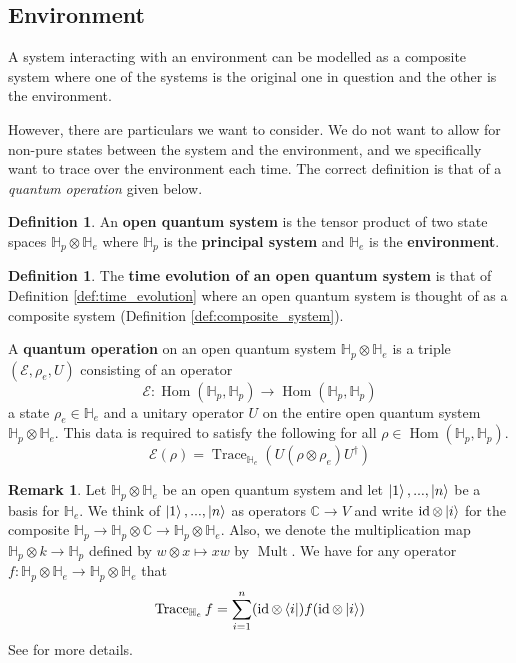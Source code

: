 \documentclass[12pt]{article}
\theoremstyle{plain}
\theoremstyle{definition}
\newtheorem{defn}[thm]{Definition} %
\newtheorem{remark}[thm]{Remark}
\newcommand{\bb}[1]{\mathbb{#1}}
\newcommand{\call}[1]{\mathcal{#1}}
\newcommand{\lto}{\longrightarrow}
\begin{document}
	\subsection{Environment}
	A system interacting with an environment can be modelled as a composite system where one of the systems is the original one in question and the other is the environment.
	
	However, there are particulars we want to consider. We do not want to allow for non-pure states between the system and the environment, and we specifically want to trace over the environment each time. The correct definition is that of a \emph{quantum operation} given below.
	
	\begin{defn}
		An \textbf{open quantum system} is the tensor product of two state spaces $\bb{H}_p \otimes \bb{H}_e$ where $\bb{H}_p$ is the \textbf{principal system} and $\bb{H}_e$ is the \textbf{environment}.
	\end{defn}
	\begin{defn}\label{def:quantum_operation_partial_trace}
		The \textbf{time evolution of an open quantum system} is that of Definition \ref{def:time_evolution} where an open quantum system is thought of as a composite system (Definition \ref{def:composite_system}).
		
		A \textbf{quantum operation} on an open quantum system $\bb{H}_p \otimes \bb{H}_e$ is a triple $(\call{E}, \rho_e, U)$ consisting of an operator
		\begin{equation}
			\call{E}: \operatorname{Hom}(\bb{H}_p, \bb{H}_p) \lto \operatorname{Hom}(\bb{H}_p, \bb{H}_p)
			\end{equation}
		a state $\rho_e \in \bb{H}_e$ and a unitary operator $U$ on the entire open quantum system $\bb{H}_p\otimes \bb{H}_e$. This data is required to satisfy the following for all $\rho \in \operatorname{Hom}(\bb{H}_p, \bb{H}_p)$.
		\begin{equation}\label{eq:quant_op_general_form}
			\call{E}(\rho) = \operatorname{Trace}_{\bb{H}_e}(U (\rho \otimes \rho_e) U^\dagger)
		\end{equation}
	\end{defn}
	\begin{remark}\label{rmk:operator_sum_derivation}
		Let $\bb{H}_p \otimes \bb{H}_e$ be an open quantum system and let $\ket{1},...,\ket{n}$ be a basis for $\bb{H}_e$. We think of $\ket{1},...,\ket{n}$ as operators $\bb{C} \lto V$ and write $\operatorname{id} \otimes \ket{i}$ for the composite $\bb{H}_p \lto \bb{H}_p \otimes \bb{C} \lto \bb{H}_p \otimes \bb{H}_e$. Also, we denote the multiplication map $\bb{H}_p \otimes k \lto \bb{H}_p$ defined by $w \otimes x \longmapsto xw$ by $\operatorname{Mult}$. We have for any operator $f: \bb{H}_p \otimes \bb{H}_e \lto \bb{H}_p \otimes \bb{H}_e$ that
		\begin{equation}\label{eq:partial_trace_exp_form}
			\operatorname{Trace}_{\bb{H}_e}f = \sum_{i = 1}^n (\operatorname{id} \otimes \bra{i})f(\operatorname{id} \otimes \ket{i})
		\end{equation}
		See \cite{CommutativeAlgebra} for more details.
	\end{remark}
\end{document}
